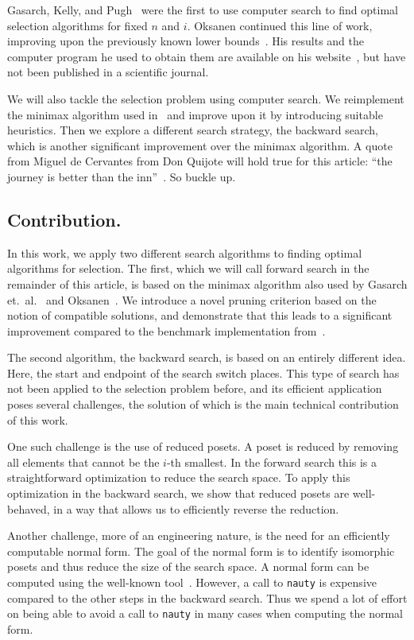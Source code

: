 \documentclass[a4paper,UKenglish,cleveref, autoref, thm-restate, anonymous]{lipics-v2021}
\begin{document}
Gasarch, Kelly, and Pugh~\cite{Gasarch1996} were the first to use computer search to find optimal selection algorithms for fixed $n$ and $i$.
Oksanen continued this line of work, improving upon the previously known lower bounds~\cite{Oksanen2006}.
His results and the computer program he used to obtain them are available on his website~\cite{Oksanen}, but have not been published in a scientific journal.

We will also tackle the selection problem using computer search.
We reimplement the minimax algorithm used in~\cite{Gasarch1996,Oksanen,Oksanen2006} and improve upon it by introducing suitable heuristics.
Then we explore a different search strategy, the backward search, which is another significant improvement over the minimax algorithm.
A quote from Miguel de Cervantes from Don Quijote will hold true for this article: ``the journey is better than the inn''~\cite{cervantes_don_quijote}.
So buckle up.

\subsection{Contribution.}
In this work, we apply two different search algorithms to finding optimal algorithms for selection.
The first, which we will call forward search in the remainder of this article, is based on the minimax algorithm also used by Gasarch et.\ al\@.~\cite{Gasarch1996} and Oksanen~\cite{Oksanen,Oksanen2006}.
We introduce a novel pruning criterion based on the notion of compatible solutions, and demonstrate that this leads to a significant improvement compared to the benchmark implementation from~\cite{Oksanen}.

The second algorithm, the backward search, is based on an entirely different idea.
Here, the start and endpoint of the search switch places.
This type of search has not been applied to the selection problem before, and its efficient application poses several challenges, the solution of which is the main technical contribution of this work.

One such challenge is the use of reduced posets.
A poset is reduced by removing all elements that cannot be the $i$-th smallest.
In the forward search this is a straightforward optimization to reduce the search space.
To apply this optimization in the backward search, we show that reduced posets are well-behaved, in a way that allows us to efficiently reverse the reduction.

Another challenge, more of an engineering nature, is the need for an efficiently computable normal form.
The goal of the normal form is to identify isomorphic posets and thus reduce the size of the search space.
A normal form can be computed using the well-known  tool~\cite{MCKAY201494}.
However, a call to \texttt{nauty} is expensive compared to the other steps in the backward search.
Thus we spend a lot of effort on being able to avoid a call to \texttt{nauty} in many cases when computing the normal form.
\end{document}
